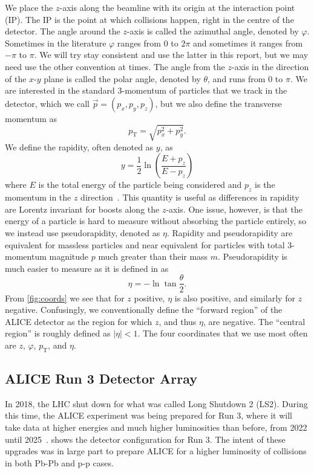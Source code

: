 We place the $z$-axis along the beamline with its origin at the interaction point (IP). The IP is the point at which collisions happen, right in the centre of the detector. The angle around the $z$-axis is called the azimuthal angle, denoted by $\varphi$. Sometimes in the literature $\varphi$ ranges from 0 to $2\pi$ and sometimes it ranges from $-\pi$ to $\pi$. We will try stay consistent and use the latter in this report, but we may need use the other convention at times. The angle from the $z$-axis in the direction of the $x$-$y$ plane is called the polar angle, denoted by $\theta$, and runs from 0 to $\pi$. We are interested in the standard 3-momentum of particles that we track in the detector, which we call $\vec{p}=(p_x,p_y,p_z)$, but we also define the transverse momentum as 
\begin{equation}
    p_{\mathrm{T}}=\sqrt{p_x^2 + p_y^2}.
    \label{eqn:transverse momentum}
\end{equation}
We define the rapidity, often denoted as $y$, as
\begin{equation}
    y=\frac 12 \ln\left(\frac{E+p_z}{E-p_z}\right)
    \label{eqn:rapidity}
\end{equation}
where $E$ is the total energy of the particle being considered and $p_z$ is the momentum in the $z$ direction~\cite{kar_exp_phys}. This quantity is useful as differences in rapidity are Lorentz invariant for boosts along the $z$-axis. One issue, however, is that the energy of a particle is hard to measure without absorbing the particle entirely, so we instead use pseudorapidity, denoted as $\eta$. Rapidity and pseudorapidity are equivalent for massless particles and near equivalent for particles with total 3-momentum magnitude $p$ much greater than their mass $m$. Pseudorapidity is much easier to measure as it is defined in \cite{kar_exp_phys} as
\begin{equation}
    \eta=-\ln\tan\frac{\theta}{2}.
    \label{eqn:pseudorapidity}
\end{equation}
From \cref{fig:coords} we see that for $z$ positive, $\eta$ is also positive, and similarly for $z$ negative. Confusingly, we conventionally define the ``forward region'' of the ALICE detector as the region for which $z$, and thus $\eta$, are negative. The ``central region'' is roughly defined as $|\eta|<1$. The four coordinates that we use most often are $z$, $\varphi$, $p_\mathrm{T}$, and $\eta$. 

\subsection{ALICE Run 3 Detector Array}
In 2018, the LHC shut down for what was called Long Shutdown 2 (LS2). During this time, the ALICE experiment was being prepared for Run 3, where it will take data at higher energies and much higher luminosities than before, from 2022 until 2025~\cite{ALICE_Upgrade_LOI}.  shows the detector configuration for Run 3. The intent of these upgrades was in large part to prepare ALICE for a higher luminosity of collisions in both Pb-Pb and p-p cases. 

